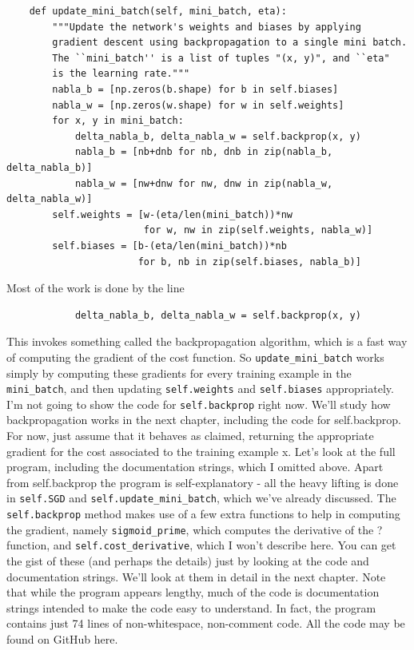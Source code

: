 \begin{lstlisting}
    def update_mini_batch(self, mini_batch, eta):
        """Update the network's weights and biases by applying
        gradient descent using backpropagation to a single mini batch.
        The ``mini_batch'' is a list of tuples "(x, y)", and ``eta"
        is the learning rate."""
        nabla_b = [np.zeros(b.shape) for b in self.biases]
        nabla_w = [np.zeros(w.shape) for w in self.weights]
        for x, y in mini_batch:
            delta_nabla_b, delta_nabla_w = self.backprop(x, y)
            nabla_b = [nb+dnb for nb, dnb in zip(nabla_b, delta_nabla_b)]
            nabla_w = [nw+dnw for nw, dnw in zip(nabla_w, delta_nabla_w)]
        self.weights = [w-(eta/len(mini_batch))*nw 
                        for w, nw in zip(self.weights, nabla_w)]
        self.biases = [b-(eta/len(mini_batch))*nb 
                       for b, nb in zip(self.biases, nabla_b)]
\end{lstlisting}
                       
Most of the work is done by the line 

\begin{lstlisting}
            delta_nabla_b, delta_nabla_w = self.backprop(x, y)
\end{lstlisting}

This invokes something called the backpropagation algorithm, which is a fast way of computing the gradient of the cost function. So \lstinline{update_mini_batch} works simply by computing these gradients for every training example in the \lstinline{mini_batch}, and then updating \lstinline{self.weights} and \lstinline{self.biases} appropriately.
I'm not going to show the code for \lstinline{self.backprop} right now. We'll study how backpropagation works in the next chapter, including the code for self.backprop. For now, just assume that it behaves as claimed, returning the appropriate gradient for the cost associated to the training example x.
Let's look at the full program, including the documentation strings, which I omitted above. Apart from self.backprop the program is self-explanatory - all the heavy lifting is done in \lstinline{self.SGD} and \lstinline{self.update_mini_batch}, which we've already discussed. The \lstinline{self.backprop} method makes use of a few extra functions to help in computing the gradient, namely \lstinline{sigmoid_prime}, which computes the derivative of the ? function, and \lstinline{self.cost_derivative}, which I won't describe here. You can get the gist of these (and perhaps the details) just by looking at the code and documentation strings. We'll look at them in detail in the next chapter. Note that while the program appears lengthy, much of the code is documentation strings intended to make the code easy to understand. In fact, the program contains just 74 lines of non-whitespace, non-comment code. All the code may be found on GitHub here.

